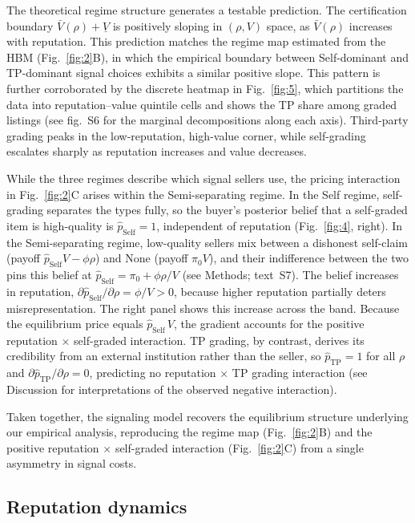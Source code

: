 \documentclass[11pt,letterpaper]{article}
\theoremstyle{definition}
\begin{document}
The theoretical regime structure generates a testable prediction. The certification boundary $\bar{V}(\rho) + \underline{V}$ is positively sloping in $(\rho, V)$ space, as $\bar{V}(\rho)$ increases with reputation. This prediction matches the regime map estimated from the HBM (Fig.~\ref{fig:2}B), in which the empirical boundary between Self-dominant and TP-dominant signal choices exhibits a similar positive slope. This pattern is further corroborated by the discrete heatmap in Fig.~\ref{fig:5}, which partitions the data into reputation--value quintile cells and shows the TP share among graded listings (see fig.~S6 for the marginal decompositions along each axis). Third-party grading peaks in the low-reputation, high-value corner, while self-grading escalates sharply as reputation increases and value decreases.

While the three regimes describe which signal sellers use, the pricing interaction in Fig.~\ref{fig:2}C arises within the Semi-separating regime. In the Self regime, self-grading separates the types fully, so the buyer's posterior belief that a self-graded item is high-quality is $\hat{p}_{\text{Self}} = 1$, independent of reputation (Fig.~\ref{fig:4}, right). In the Semi-separating regime, low-quality sellers mix between a dishonest self-claim (payoff $\hat{p}_{\text{Self}}V - \phi\rho$) and None (payoff $\pi_0 V$), and their indifference between the two pins this belief at $\hat{p}_{\text{Self}} = \pi_0 + \phi\rho/V$ (see Methods; text~S7). The belief increases in reputation, $\partial\hat{p}_{\text{Self}}/\partial\rho = \phi/V > 0$, because higher reputation partially deters misrepresentation. The right panel shows this increase across the band. Because the equilibrium price equals $\hat{p}_{\text{Self}}\,V$, the gradient accounts for the positive reputation $\times$ self-graded interaction. TP grading, by contrast, derives its credibility from an external institution rather than the seller, so $\hat{p}_{\text{TP}} = 1$ for all $\rho$ and $\partial\hat{p}_{\text{TP}}/\partial\rho = 0$, predicting no reputation $\times$ TP grading interaction (see Discussion for interpretations of the observed negative interaction).

Taken together, the signaling model recovers the equilibrium structure underlying our empirical analysis, reproducing the regime map (Fig.~\ref{fig:2}B) and the positive reputation $\times$ self-graded interaction (Fig.~\ref{fig:2}C) from a single asymmetry in signal costs.

\subsection*{Reputation dynamics}
\end{document}

